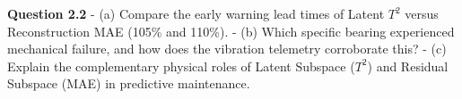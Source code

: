 \vspace{0.4em}
\begin{tcolorbox}[colback=blue!5!white,colframe=blue!60!black,boxrule=0.8pt,arc=3pt,left=6pt,right=6pt,top=4pt,bottom=4pt,unbreakable,before upper={\sloppy\raggedright},title=\textbf{\small Assignment Prompt: Question 2.2}]
\textbf{Question 2.2} - (a) Compare the early warning lead times of Latent \(T^2\) versus Reconstruction MAE (105\% and 110\%). - (b) Which specific bearing experienced mechanical failure, and how does the vibration telemetry corroborate this? - (c) Explain the complementary physical roles of Latent Subspace (\(T^2\)) and Residual Subspace (MAE) in predictive maintenance.
\end{tcolorbox}
\vspace{0.3em}
\vspace{0.4em}
